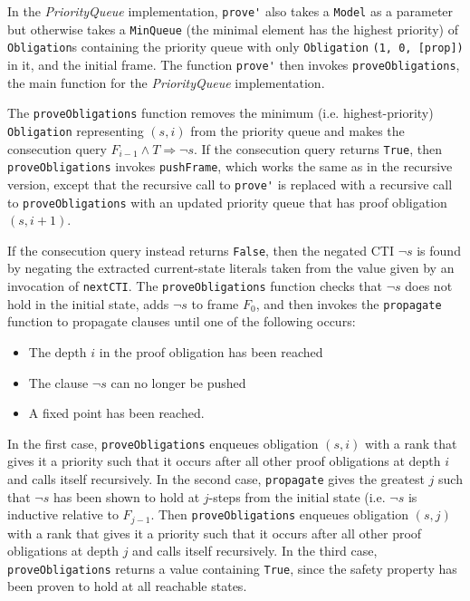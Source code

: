 \documentclass[12pt,a4paper,twoside,openright]{report}
\begin{document}
In the \emph{PriorityQueue} implementation, \verb,prove', also takes a \verb,Model, as a parameter
but otherwise takes a \verb,MinQueue, (the minimal element has the highest
priority) of \verb,Obligation,s containing the priority queue with only \verb,Obligation,
\verb.(1, 0, [prop]). in it, and the initial frame. The function \verb,prove', then invokes \verb,proveObligations,,
the main function for the \emph{PriorityQueue} implementation.

The \verb,proveObligations, function removes the minimum (i.e. highest-priority) \verb,Obligation, 
representing $(s,i)$ from the priority queue and makes the consecution query
$F_{i - 1} \wedge T \Rightarrow \neg s$. If the consecution query returns \verb,True,,
then \verb,proveObligations, invokes \verb,pushFrame,, which works the same as in the recursive version,
except that the recursive call to \verb,prove', is replaced with a recursive call to \verb,proveObligations,
with an updated priority queue that has proof obligation $(s, i + 1)$.

If the consecution query instead returns \verb,False,, then the negated CTI $\neg s$ is found by
negating the extracted current-state literals taken from the value given by an invocation of \verb,nextCTI,.
The \verb,proveObligations, function checks that $\neg s$ does not hold in the initial state, adds $\neg s$
to frame $F_0$, and then invokes the \verb,propagate, function to propagate clauses until one of the following
occurs:
\begin{itemize}
\item The depth $i$ in the proof obligation has been reached
\item The clause $\neg s$ can no longer be pushed
\item A fixed point has been reached.
\end{itemize}
In the first case, \verb,proveObligations, enqueues obligation $(s,i)$ with a rank that gives it a priority
such that it occurs after all other proof obligations at depth $i$ and calls itself recursively.
In the second case, \verb,propagate, gives the greatest $j$ such that $\neg s$ has been shown to hold at
$j$-steps from the initial state (i.e. $\neg s$ is inductive relative to $F_{j - 1}$. Then \verb,proveObligations,
enqueues obligation $(s,j)$ with a rank that gives it a priority such that it occurs after all other
proof obligations at depth $j$ and calls itself recursively.
In the third case, \verb,proveObligations, returns a value containing \verb,True,, since the safety property
has been proven to hold at all reachable states.
\end{document}
